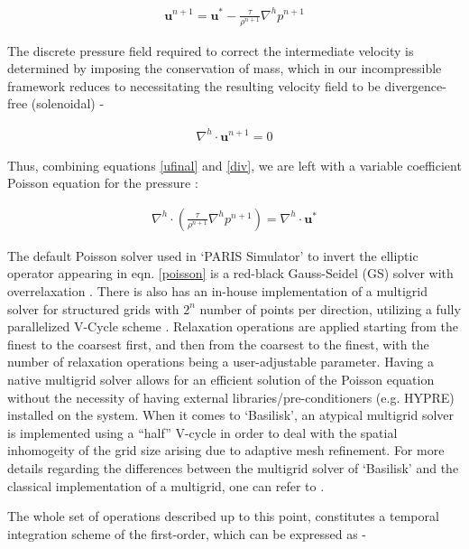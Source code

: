 \begin{align}
\boldsymbol{u}^{n+1} = \boldsymbol{u}^{*} - \frac{\tau}{\rho^{n+1}}\nabla^{h}p^{n+1}
\label{ufinal}
\end{align}

The discrete pressure field required to correct the intermediate velocity 
is determined by imposing the conservation of mass, which in our incompressible 
framework reduces to necessitating the resulting velocity field to be divergence-free (solenoidal) - 

\begin{align}
\nabla^{h}\cdot\boldsymbol{u}^{n+1} = 0
\label{div}
\end{align}

Thus, combining equations \ref{ufinal} and \ref{div}, 
we are left with a variable coefficient Poisson equation for the pressure :  

\begin{align}
\nabla^{h}\cdot\left(\frac{\tau}{\rho^{n+1}}\nabla^{h}p^{n+1}\right) = \nabla^{h}\cdot \boldsymbol{u}^{*} 
	\label{poisson}
\end{align}

The default Poisson solver used in `PARIS Simulator' to invert the elliptic operator 
appearing in eqn. \ref{poisson} is a red-black 
Gauss-Seidel (GS) solver with overrelaxation . 
There is also has an in-house implementation of a multigrid solver 
for structured grids with $2^{n}$ number of points per direction, 
utilizing a fully parallelized V-Cycle scheme \cite{briggs1987}. 
Relaxation operations are applied starting from the finest to the coarsest first, 
and then from the coarsest to the finest, with the number of relaxation operations 
being a user-adjustable parameter. Having a native multigrid solver allows 
for an efficient solution of the Poisson equation without the necessity
of having external libraries/pre-conditioners (e.g. HYPRE) installed on the system.
When it comes to `Basilisk', an atypical multigrid solver is implemented using 
a ``half'' V-cycle in order to deal with the spatial inhomogeity of the grid size
arising due to adaptive mesh refinement. 
For more details regarding the differences between the multigrid solver of `Basilisk'
and the classical implementation of a multigrid, one can refer to .


The whole set of operations described up to this point, 
constitutes a temporal integration scheme of the first-order, which can be expressed as -

